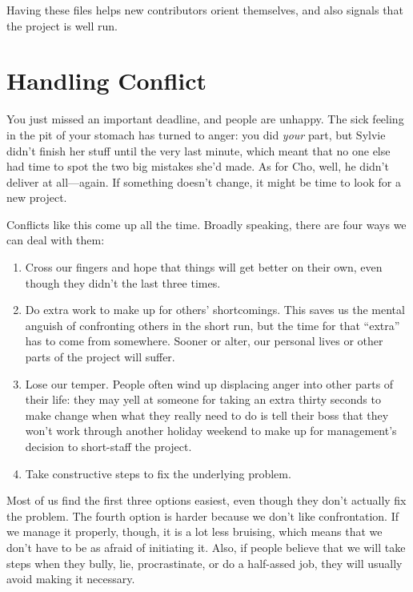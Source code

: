 \documentclass[
]{krantz}
\begin{document}
Having these files helps new contributors orient themselves,
and also signals that the project is well run.

\hypertarget{teams-conflict}{%
\section{Handling Conflict}\label{teams-conflict}}

You just missed an important deadline,
and people are unhappy.
The sick feeling in the pit of your stomach has turned to anger:
you did \emph{your} part,
but Sylvie didn't finish her stuff until the very last minute,
which meant that no one else had time to spot the two big mistakes she'd made.
As for Cho,
well, he didn't deliver at all---again.
If something doesn't change,
it might be time to look for a new project.

Conflicts like this come up all the time.
Broadly speaking, there are four ways we can deal with them:

\begin{enumerate}
\def\labelenumi{\arabic{enumi}.}
\item
  Cross our fingers and hope that things will get better on their own,
  even though they didn't the last three times.
\item
  Do extra work to make up for others' shortcomings.
  This saves us the mental anguish of confronting others in the short run,
  but the time for that ``extra'' has to come from somewhere.
  Sooner or alter,
  our personal lives or other parts of the project will suffer.
\item
  Lose our temper.
  People often wind up displacing anger into other parts of their life:
  they may yell at someone for taking an extra thirty seconds to make change
  when what they really need to do is tell their boss
  that they won't work through another holiday weekend
  to make up for management's decision to short-staff the project.
\item
  Take constructive steps to fix the underlying problem.
\end{enumerate}

Most of us find the first three options easiest,
even though they don't actually fix the problem.
The fourth option is harder because we don't like confrontation.
If we manage it properly,
though,
it is a lot less bruising,
which means that we don't have to be as afraid of initiating it.
Also,
if people believe that we will take steps when they bully, lie, procrastinate, or do a half-assed job,
they will usually avoid making it necessary.
\end{document}
